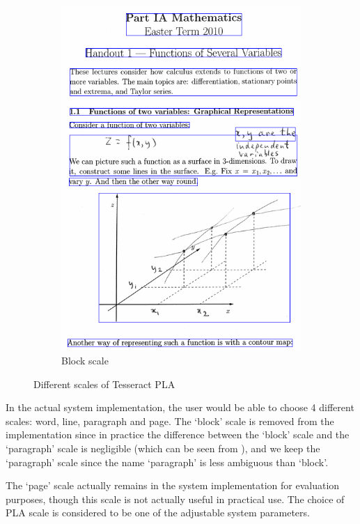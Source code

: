 \begin{figure}[!ht]
\begin{subfigure}{.42\textwidth}
    \includegraphics[width=\textwidth]{pla-block.png}
    \caption{Block scale}
  \end{subfigure}
  \caption{Different scales of Tesseract PLA}
  \label{fig:tess-pla-scales}
\end{figure}

In the actual system implementation, the user would be able to choose 4 different scales: word, line, paragraph and page. The `block' scale is removed from the implementation since in practice the difference between the `block' scale and the `paragraph' scale is negligible (which can be seen from ), and we keep the `paragraph' scale since the name `paragraph' is less ambiguous than `block'. 

The `page' scale actually remains in the system implementation for evaluation purposes, though this scale is not actually useful in practical use. The choice of PLA scale is considered to be one of the adjustable system parameters.

